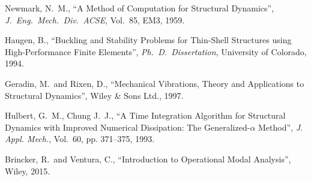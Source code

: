 \begin{thebibliography}{99}
Newmark, N.\ M.,
``A Method of Computation for Structural Dynamics'',
\textit{J.\ Eng.\ Mech.\ Div.\ ACSE},
Vol.\ 85, EM3, 1959.

Haugen, B.,
``Buckling and Stability Problems for Thin-Shell Structures using High-Performance Finite Elements'',
\textit{Ph.\ D.\ Dissertation},
University of Colorado, 1994.

Geradin, M.\ and Rixen, D.,
``Mechanical Vibrations, Theory and Applications to Structural Dynamics'',
Wiley \& Sons Ltd., 1997.

Hulbert, G.\ M., Chung J.\ J.,
``A Time Integration Algorithm for Structural Dynamics with Improved Numerical Dissipation: The Generalized-$\alpha$ Method'',
\textit{J. Appl. Mech.},
Vol.\ 60, pp. 371--375, 1993.

Brincker, R.\ and Ventura, C.,
``Introduction to Operational Modal Analysis'',
Wiley, 2015.

\iftoggle{publicedition}{}{%
\bibitem{Chakrabarti}
Chakrabarti, S.\ K.,
``Hydrodynamics of Offshore Structures'',
WIT Press, 1987.
} %

\end{thebibliography}
